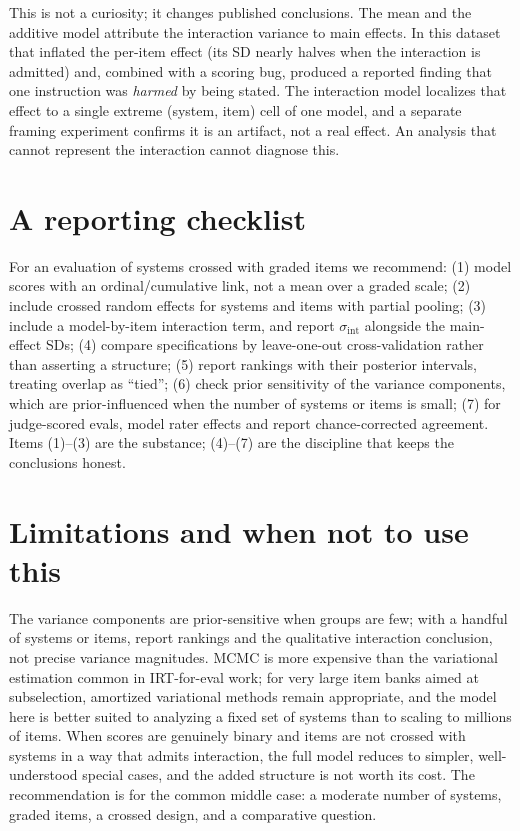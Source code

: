 \documentclass{llncs}
\begin{document}
This is not a curiosity; it changes published conclusions. The mean and the
additive model attribute the interaction variance to main effects. In this
dataset that inflated the per-item effect (its SD nearly halves when the
interaction is admitted) and, combined with a scoring bug, produced a
reported finding that one instruction was \emph{harmed} by being stated. The
interaction model localizes that effect to a single extreme (system, item)
cell of one model, and a separate framing experiment confirms it is an
artifact, not a real effect. An analysis that cannot represent the
interaction cannot diagnose this.

\section{A reporting checklist}
\label{sec:checklist}

For an evaluation of systems crossed with graded items we recommend:
(1) model scores with an ordinal/cumulative link, not a mean over a graded
scale; (2) include crossed random effects for systems and items with partial
pooling; (3) include a model-by-item interaction term, and report
$\sigma_{\text{int}}$ alongside the main-effect SDs; (4) compare
specifications by leave-one-out cross-validation rather than asserting a
structure; (5) report rankings with their posterior intervals, treating
overlap as ``tied''; (6) check prior sensitivity of the variance components,
which are prior-influenced when the number of systems or items is small; (7)
for judge-scored evals, model rater effects and report chance-corrected
agreement. Items (1)--(3) are the substance; (4)--(7) are the discipline that
keeps the conclusions honest.

\section{Limitations and when not to use this}
\label{sec:limits}

The variance components are prior-sensitive when groups are few; with a
handful of systems or items, report rankings and the qualitative
interaction conclusion, not precise variance magnitudes. MCMC is more
expensive than the variational estimation common in IRT-for-eval work; for
very large item banks aimed at subselection, amortized variational methods
remain appropriate, and the model here is better suited to analyzing a fixed
set of systems than to scaling to millions of items. When scores are
genuinely binary and items are not crossed with systems in a way that admits
interaction, the full model reduces to simpler, well-understood special
cases, and the added structure is not worth its cost. The recommendation is
for the common middle case: a moderate number of systems, graded items, a
crossed design, and a comparative question.
\end{document}
